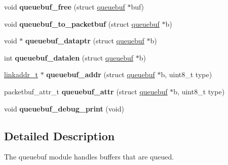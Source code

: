\begin{DoxyCompactItemize}
\item 
\hypertarget{group__rimequeuebuf_ga5cdc28a49daaef0e7d3d4106214dd645}{}void {\bfseries queuebuf\+\_\+free} (struct \hyperlink{structqueuebuf}{queuebuf} $\ast$buf)\label{group__rimequeuebuf_ga5cdc28a49daaef0e7d3d4106214dd645}

\item 
\hypertarget{group__rimequeuebuf_gaa65ae304c4a2187e9deab68433ba0d54}{}void {\bfseries queuebuf\+\_\+to\+\_\+packetbuf} (struct \hyperlink{structqueuebuf}{queuebuf} $\ast$b)\label{group__rimequeuebuf_gaa65ae304c4a2187e9deab68433ba0d54}

\item 
\hypertarget{group__rimequeuebuf_ga2b1e06ef2586847dafa003dde1747181}{}void $\ast$ {\bfseries queuebuf\+\_\+dataptr} (struct \hyperlink{structqueuebuf}{queuebuf} $\ast$b)\label{group__rimequeuebuf_ga2b1e06ef2586847dafa003dde1747181}

\item 
\hypertarget{group__rimequeuebuf_gad560b364f76dc202e0ae5b8e0390334c}{}int {\bfseries queuebuf\+\_\+datalen} (struct \hyperlink{structqueuebuf}{queuebuf} $\ast$b)\label{group__rimequeuebuf_gad560b364f76dc202e0ae5b8e0390334c}

\item 
\hypertarget{group__rimequeuebuf_ga6d24a5d32a06fa201a2c2e6a2b6303ad}{}\hyperlink{unionlinkaddr__t}{linkaddr\+\_\+t} $\ast$ {\bfseries queuebuf\+\_\+addr} (struct \hyperlink{structqueuebuf}{queuebuf} $\ast$b, uint8\+\_\+t type)\label{group__rimequeuebuf_ga6d24a5d32a06fa201a2c2e6a2b6303ad}

\item 
\hypertarget{group__rimequeuebuf_ga38e39840c02aa09fcdae97d7e80536a8}{}packetbuf\+\_\+attr\+\_\+t {\bfseries queuebuf\+\_\+attr} (struct \hyperlink{structqueuebuf}{queuebuf} $\ast$b, uint8\+\_\+t type)\label{group__rimequeuebuf_ga38e39840c02aa09fcdae97d7e80536a8}

\item 
\hypertarget{group__rimequeuebuf_ga6d8d29696760a6654e704625da1a2597}{}void {\bfseries queuebuf\+\_\+debug\+\_\+print} (void)\label{group__rimequeuebuf_ga6d8d29696760a6654e704625da1a2597}

\end{DoxyCompactItemize}


\subsection{Detailed Description}
The queuebuf module handles buffers that are queued. 